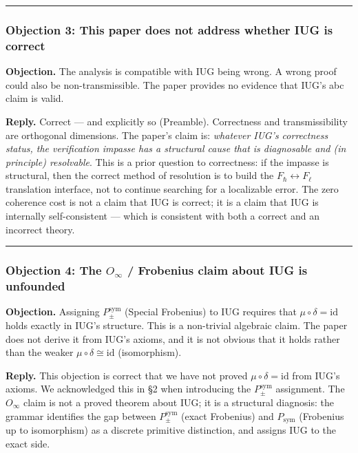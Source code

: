 \documentclass[10pt,a4paper]{article}
\begin{document}
\begin{center}
\rule{0.5\textwidth}{0.4pt}
\end{center}

\subsubsection{Objection 3: This paper does not address whether IUG is correct}

\textbf{Objection.} The analysis is compatible with IUG being wrong. A wrong proof could also be
non-transmissible. The paper provides no evidence that IUG's abc claim is valid.

\textbf{Reply.} Correct --- and explicitly so (Preamble). Correctness and transmissibility are
orthogonal dimensions. The paper's claim is: \emph{whatever IUG's correctness status, the
verification impasse has a structural cause that is diagnosable and (in principle)
resolvable}. This is a prior question to correctness: if the impasse is structural, then the
correct method of resolution is to build the $F_{\hbar} \leftrightarrow F_{\ell}$ translation
interface, not to continue searching for a localizable error. The zero coherence cost is
not a claim that IUG is correct; it is a claim that IUG is internally self-consistent ---
which is consistent with both a correct and an incorrect theory.

\begin{center}
\rule{0.5\textwidth}{0.4pt}
\end{center}

\subsubsection{Objection 4: The $O_{\infty}$ / Frobenius claim about IUG is unfounded}

\textbf{Objection.} Assigning $P_{\pm}^{\text{sym}}$ (Special Frobenius) to IUG requires that
$\mu \circ \delta = \text{id}$ holds exactly in IUG's structure.
This is a non-trivial algebraic claim.
The paper does not derive it from IUG's axioms, and it is not obvious that it holds
rather than the weaker $\mu \circ \delta \cong \text{id}$ (isomorphism).

\textbf{Reply.} This objection is correct that we have not proved $\mu \circ \delta = \text{id}$
from IUG's axioms.
We acknowledged this in \S2 when introducing the $P_{\pm}^{\text{sym}}$ assignment.
The $O_{\infty}$ claim is not a proved theorem about IUG; it is a structural diagnosis:
the grammar identifies the gap between $P_{\pm}^{\text{sym}}$ (exact Frobenius) and
$P_\text{sym}$ (Frobenius up to isomorphism) as a discrete primitive distinction,
and assigns IUG to the exact side.
\end{document}

